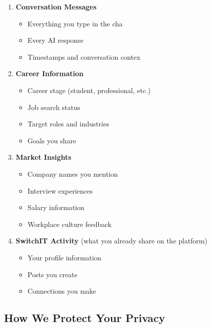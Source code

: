 \documentclass[12pt,a4paper]{article}
\begin{document}
\begin{enumerate}
  \item \textbf{Conversation Messages}
  \begin{itemize}
    \item Everything you type in the cha
    \item Every AI response
    \item Timestamps and conversation contex
  \end{itemize}

  \item \textbf{Career Information}
  \begin{itemize}
    \item Career stage (student, professional, etc.)
    \item Job search status
    \item Target roles and industries
    \item Goals you share
  \end{itemize}

  \item \textbf{Market Insights}
  \begin{itemize}
    \item Company names you mention
    \item Interview experiences
    \item Salary information
    \item Workplace culture feedback
  \end{itemize}

  \item \textbf{SwitchIT Activity} (what you already share on the platform)
  \begin{itemize}
    \item Your profile information
    \item Posts you create
    \item Connections you make
  \end{itemize}
\end{enumerate}

\subsection{How We Protect Your Privacy}
\end{document}
